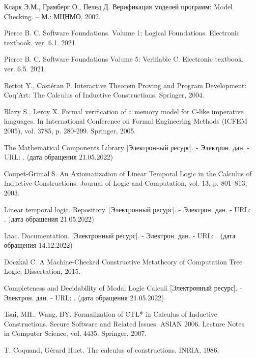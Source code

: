 \documentclass[12pt]{article}
\begin{document}
%
\begin{thebibliography}{99}%

     Кларк Э.М., Грамберг О., Пелед Д. Верификация моделей программ: Model Checking. – М.: МЦНМО, 2002.
    
     Pierce B. C. Software Foundations. Volume 1: Logical Foundations. Electronic textbook. ver. 6.1. 2021.
    
     Pierce B. C. Software Foundations Volume 5: Verifiable C. Electronic textbook. ver. 6.5. 2021.

     Bertot Y., Castéran P. Interactive Theorem Proving and Program Development: Coq’Art: The Calculus of Inductive Constructions. Springer, 2004.

     Blazy S., Leroy X. Formal verification of a memory model for C-like imperative languages. In International Conference on Formal Engineering Methods (ICFEM 2005), vol. 3785, p. 280-299. Springer, 2005.
    
    The Mathematical Components Library [Электронный ресурс]. - Электрон. дан. - URL: . (дата обращения 21.05.2022)
    
     Coupet-Grimal S. An Axiomatization of Linear Temporal Logic in the Calculus of Inductive Constructions. Journal of Logic and Computation, vol. 13, p. 801–813, 2003.
    
     Linear temporal logic. Repository. [Электронный ресурс]. - Электрон. дан. - URL: . (дата обращения 21.05.2022)

     Ltac. Documentation. [Электронный ресурс]. - Электрон. дан. - URL: . (дата обращения 14.12.2022)
    
     Doczkal C. A Machine-Checked Constructive Metatheory of Computation Tree Logic. Dissertation, 2015.

    Completeness and Decidability of Modal Logic Calculi [Электронный ресурс]. - Электрон. дан. - URL: . (дата обращения 21.05.2022)
    
     Tsai, MH., Wang, BY. Formalization of CTL* in Calculus of Inductive Constructions. Secure Software and Related Issues. ASIAN 2006. Lecture Notes in Computer Science, vol. 4435. Springer, 2007.

    T. Coquand, Gérard Huet. The calculus of constructions. INRIA, 1986.
    
\end{thebibliography}
  
\end{document}
